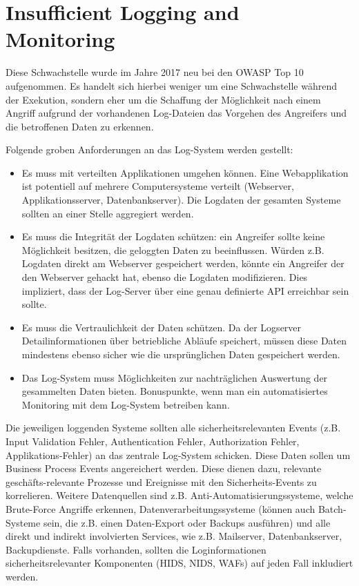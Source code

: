 \section{Insufficient Logging and Monitoring}

Diese Schwachstelle wurde im Jahre 2017 neu bei den OWASP Top 10 aufgenommen. Es handelt sich hierbei weniger um eine Schwachstelle während der Exekution, sondern eher um die Schaffung der Möglichkeit nach einem Angriff aufgrund der vorhandenen Log-Dateien das Vorgehen des Angreifers und die betroffenen Daten zu erkennen.

Folgende groben Anforderungen an das Log-System werden gestellt:

\begin{itemize}
	\item Es muss mit verteilten Applikationen umgehen können. Eine Webapplikation ist potentiell auf mehrere Computersysteme verteilt (Webserver, Applikationsserver, Datenbankserver). Die Logdaten der gesamten Systeme sollten an einer Stelle aggregiert werden.
	\item Es muss die Integrität der Logdaten schützen: ein Angreifer sollte keine Möglichkeit besitzen, die geloggten Daten zu beeinflussen. Würden z.B. Logdaten direkt am Webserver gespeichert werden, könnte ein Angreifer der den Webserver gehackt hat, ebenso die Logdaten modifizieren. Dies impliziert, dass der Log-Server über eine genau definierte API erreichbar sein sollte.
	\item Es muss die Vertraulichkeit der Daten schützen. Da der Logserver Detailinformationen über betriebliche Abläufe speichert, müssen diese Daten mindestens ebenso sicher wie die ursprünglichen Daten gespeichert werden.
	\item Das Log-System muss Möglichkeiten zur nachträglichen Auswertung der gesammelten Daten bieten. Bonuspunkte, wenn man ein automatisiertes Monitoring mit dem Log-System betreiben kann.
\end{itemize}

Die jeweiligen loggenden Systeme sollten alle sicherheitsrelevanten Events (z.B. Input Validation Fehler, Authentication Fehler, Authorization Fehler, Applikations-Fehler) an das zentrale Log-System schicken. Diese Daten sollen um Business Process Events angereichert werden. Diese dienen dazu, relevante geschäfts-relevante Prozesse und Ereignisse mit den Sicherheits-Events zu korrelieren. Weitere Datenquellen sind z.B. Anti-Automatisierungssysteme, welche Brute-Force Angriffe erkennen, Datenverarbeitungssysteme (können auch Batch-Systeme sein, die z.B. einen Daten-Export oder Backups ausführen) und alle direkt und indirekt involvierten Services, wie z.B. Mailserver, Datenbankserver, Backupdienste. Falls vorhanden, sollten die Loginformationen sicherheitsrelevanter Komponenten (HIDS, NIDS, WAFs) auf jeden Fall inkludiert werden.

